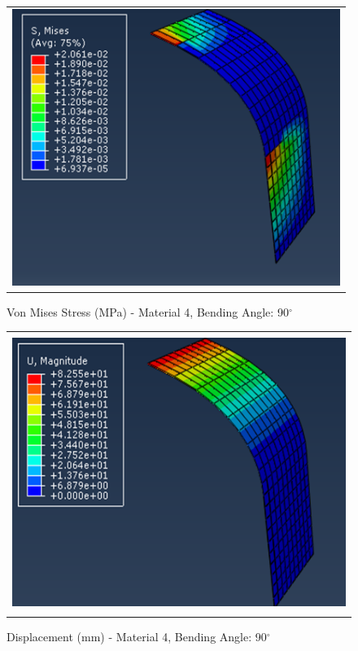 \documentclass[a4paper,12pt]{article}
\numberwithin{equation}{section}
\numberwithin{figure}{section}
\begin{document}
\begin{figure}[H]
  \centering
  \begin{tabular}{@{}c@{}}
    \includegraphics[width=0.7\linewidth,height=255pt]{Results/Bending/M4_VMS_90.png} \\
  \end{tabular}
  \caption{Von Mises Stress (MPa) - Material 4,  Bending Angle: 90$^{\circ}$ }
\end{figure}

\begin{figure}[H]
  \centering
  \begin{tabular}{@{}c@{}}
    \includegraphics[width=0.7\linewidth,height=255pt]{Results/Bending/M4_DIS_90.png} \\
  \end{tabular}
  \caption{Displacement (mm) - Material 4, Bending Angle: 90$^{\circ}$ }
\end{figure}
\end{document}
